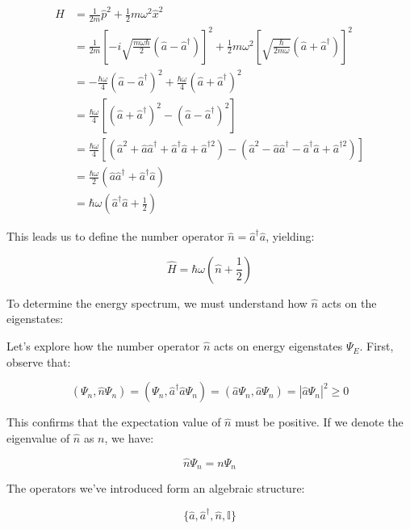 \documentclass[italian]{HKNdocument}
\begin{document}
\begin{align}
\hat{H} &= \frac{1}{2m}\hat{p}^2 + \frac{1}{2}m\omega^2\hat{x}^2 \\
&= \frac{1}{2m}\left[-i\sqrt{\frac{m\omega\hbar}{2}}(\hat{a} - \hat{a}^\dagger)\right]^2 + \frac{1}{2}m\omega^2\left[\sqrt{\frac{\hbar}{2m\omega}}(\hat{a} + \hat{a}^\dagger)\right]^2 \\
&= -\frac{\hbar\omega}{4}(\hat{a} - \hat{a}^\dagger)^2 + \frac{\hbar\omega}{4}(\hat{a} + \hat{a}^\dagger)^2 \\
&= \frac{\hbar\omega}{4}[(\hat{a} + \hat{a}^\dagger)^2 - (\hat{a} - \hat{a}^\dagger)^2]  \\
&= \frac{\hbar\omega}{4}[(\hat{a}^2 + \hat{a}\hat{a}^\dagger + \hat{a}^\dagger\hat{a} + \hat{a}^{\dagger2}) - (\hat{a}^2 - \hat{a}\hat{a}^\dagger - \hat{a}^\dagger\hat{a} + \hat{a}^{\dagger2})] \\
&= \frac{\hbar\omega}{2}(\hat{a}\hat{a}^\dagger + \hat{a}^\dagger\hat{a}) \\
&= \hbar\omega\left(\hat{a}^\dagger\hat{a} + \frac{1}{2}\right)
\end{align}

This leads us to define the number operator $\hat{n} = \hat{a}^\dagger\hat{a}$, yielding:

\begin{equation}
\hat{H} = \hbar\omega\left(\hat{n} + \frac{1}{2}\right)
\end{equation}

To determine the energy spectrum, we must understand how $\hat{n}$ acts on the eigenstates:


Let's explore how the number operator $\hat{n}$ acts on energy eigenstates $\Psi_E$. First, observe that:

\begin{equation}
(\Psi_n, \hat{n}\Psi_n) = (\Psi_n, \hat{a}^\dagger\hat{a}\Psi_n) = (\hat{a}\Psi_n, \hat{a}\Psi_n) = |\hat{a}\Psi_n|^2 \geq 0
\end{equation}

This confirms that the expectation value of $\hat{n}$ must be positive. If we denote the eigenvalue of $\hat{n}$ as $n$, we have:

\begin{equation}
\hat{n}\Psi_n = n\Psi_n
\end{equation}

The operators we've introduced form an algebraic structure:

\begin{equation}
\{\hat{a}, \hat{a}^\dagger, \hat{n}, \mathbb{I}\}
\end{equation}
\end{document}

